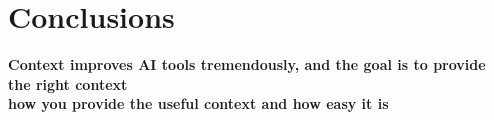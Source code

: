 \documentclass[aspectratio=169, 10pt]{beamer}
\begin{document}









\sourceline{}

\section{Conclusions }

\begin{frame}
  \centering
  \textbf{ Context improves AI tools tremendously, and the goal is to provide the right context} \\
  \bigskip 
  \textbf{ how you provide the useful context and how easy it is}
  \bigskip \end{frame}
\end{document}
